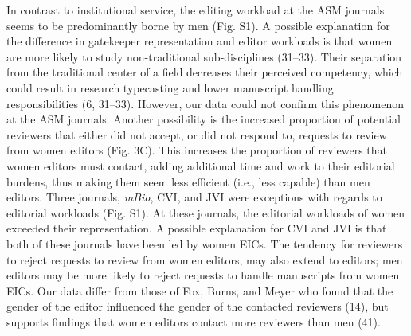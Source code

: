 \documentclass[11pt,]{article}
\begin{document}
In contrast to institutional service, the editing workload at the ASM
journals seems to be predominantly borne by men (Fig. S1). A possible
explanation for the difference in gatekeeper representation and editor
workloads is that women are more likely to study non-traditional
sub-disciplines (31--33). Their separation from the traditional center
of a field decreases their perceived competency, which could result in
research typecasting and lower manuscript handling responsibilities (6,
31--33). However, our data could not confirm this phenomenon at the ASM
journals. Another possibility is the increased proportion of potential
reviewers that either did not accept, or did not respond to, requests to
review from women editors (Fig. 3C). This increases the proportion of
reviewers that women editors must contact, adding additional time and
work to their editorial burdens, thus making them seem less efficient
(i.e., less capable) than men editors. Three journals, \emph{mBio}, CVI,
and JVI were exceptions with regards to editorial workloads (Fig. S1).
At these journals, the editorial workloads of women exceeded their
representation. A possible explanation for CVI and JVI is that both of
these journals have been led by women EICs. The tendency for reviewers
to reject requests to review from women editors, may also extend to
editors; men editors may be more likely to reject requests to handle
manuscripts from women EICs. Our data differ from those of Fox, Burns,
and Meyer who found that the gender of the editor influenced the gender
of the contacted reviewers (14), but supports findings that women
editors contact more reviewers than men (41).
\end{document}
